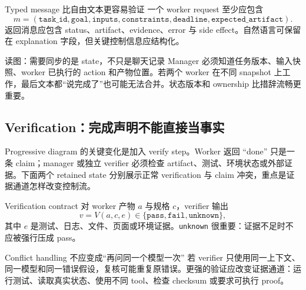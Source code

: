 
\begin{importantbox}{Typed message 比自由文本更容易验证}
一个 worker request 至少应包含
\[
m=(\texttt{task\_id},\texttt{goal},\texttt{inputs},\texttt{constraints},\texttt{deadline},\texttt{expected\_artifact}).
\]
返回消息应包含 status、artifact、evidence、error 与 side effect。自然语言可保留在 explanation 字段，但关键控制信息应结构化。
\end{importantbox}


\begin{knowledgebox}{读图：需要同步的是 state，不只是聊天记录}
Manager 必须知道任务版本、输入快照、worker 已执行的 action 和产物位置。若两个 worker 在不同 snapshot 上工作，最后文本都“说完成了”也可能无法合并。状态版本和 ownership 比措辞流畅更重要。
\end{knowledgebox}

\subsection{Verification：完成声明不能直接当事实}

Progressive diagram 的关键变化是加入 verify step。Worker 返回 “done” 只是一条 claim；manager 或独立 verifier 必须检查 artifact、测试、环境状态或外部证据。下面两个 retained state 分别展示正常 verification 与 claim 冲突，重点是证据通道怎样改变控制流。


\begin{importantbox}{Verification contract}
对 worker 产物 $a$ 与规格 $c$，verifier 输出
\[
v=V(a,c,e)\in\{\texttt{pass},\texttt{fail},\texttt{unknown}\},
\]
其中 $e$ 是测试、日志、文件、页面或环境证据。\texttt{unknown} 很重要：证据不足时不应被强行压成 pass。
\end{importantbox}


\begin{warningbox}{Conflict handling 不应变成“再问同一个模型一次”}
若 verifier 只使用同一上下文、同一模型和同一错误假设，复核可能重复原错误。更强的验证应改变证据通道：运行测试、读取真实状态、使用不同 tool、检查 checksum 或要求可执行 proof。
\end{warningbox}

